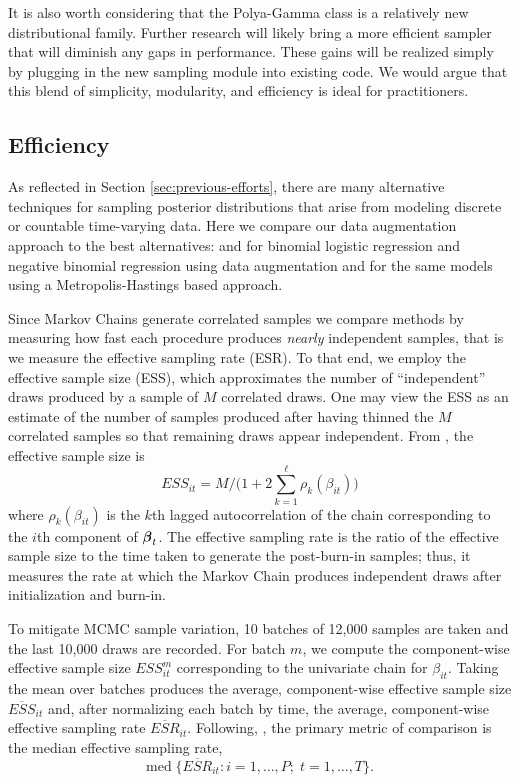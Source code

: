 It is also worth considering that the Polya-Gamma class is a relatively new
distributional family.  Further research will likely bring a more efficient
sampler that will diminish any gaps in performance.  These gains will be
realized simply by plugging in the new sampling module into existing code.  We
would argue that this blend of simplicity, modularity, and efficiency is ideal
for practitioners.

\subsection{Efficiency}

As reflected in Section \ref{sec:previous-efforts}, there are many alternative
techniques for sampling posterior distributions that arise from modeling
discrete or countable time-varying data.  Here we compare our data augmentation
approach to the best alternatives: \cite{fussl-etal-2013} and
\cite{fruhwirth-schnatter-etal-2009} for binomial logistic regression and
negative binomial regression using data augmentation and \cite{migon-etal-2013}
for the same models using a Metropolis-Hastings based approach.

Since Markov Chains generate correlated samples we compare methods by measuring
how fast each procedure produces \emph{nearly} independent samples, that is we
measure the effective sampling rate (ESR).  To that end, we employ the effective
sample size (ESS), which approximates the number of ``independent'' draws
produced by a sample of $M$ correlated draws.  One may view the ESS as an
estimate of the number of samples produced after having thinned the $M$
correlated samples so that remaining draws appear independent.  From
\citet{holmes-held-2006}, the effective sample size is
\[
ESS_{it} = M / \Big( 1 + 2 \sum_{k=1}^\ell \rho_k(\beta_{it}) \Big)
\]
where $\rho_k(\beta_{it})$ is the $k$th lagged autocorrelation of the chain
corresponding to the $i$th component of $\boldsymbol{\beta}_t$.  The effective
sampling rate is the ratio of the effective sample size to the time taken to
generate the post-burn-in samples; thus, it measures the rate at which the
Markov Chain produces independent draws after initialization and burn-in.

To mitigate MCMC sample variation, 10 batches of 12,000 samples are taken and
the last 10,000 draws are recorded.  For batch $m$, we compute the
component-wise effective sample size $ESS_{it}^{m}$ corresponding to the
univariate chain for $\beta_{it}$.  Taking the mean over batches produces the
average, component-wise effective sample size $\overline{ESS}_{it}$ and, after
normalizing each batch by time, the average, component-wise effective sampling
rate $\overline{ESR}_{it}$.  Following,
\citet{fruhwirth-schnatter-fruhwirth-2010}, the primary metric of comparison is
the median effective sampling rate,
\[
\text{med} \; \Big\{ \overline{ESR}_{it} : i=1, \ldots, P; \;  t=1, \ldots, T \Big\}.
\]

